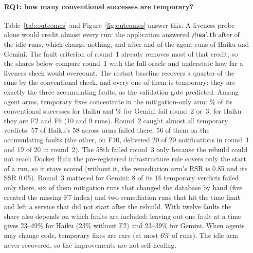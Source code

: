 \paragraph{RQ1: how many conventional successes are temporary?} Table~\ref{tab:outcomes} and Figure~\ref{fig:outcomes}
answer this. A liveness probe alone would credit almost every run: the application answered \texttt{/health} after
\numliveIdleHaiku{} of the idle runs, which change nothing, and after \numliveAIHaiku{} and \numliveAIGemini{} of the agent
runs of Haiku and Gemini. The fault criterion of round~1 already removes most of that credit, so the shares below compare
round~1 with the full oracle and understate how far a liveness check would overcount. The restart baseline recovers a quarter of the runs by the conventional check, and every one of them is
temporary: they are exactly the three accumulating faults, as the validation gate predicted. Among agent arms, temporary
fixes concentrate in the mitigation-only arm: \nummitTempShareHaiku\% of its conventional successes for Haiku and
\nummitTempShareGemini\% for Gemini fail round~2 or~3; for Haiku they are F2 and F6 (10 and 9 runs). Round~2 caught
almost all temporary verdicts: 57 of Haiku's 58 across arms failed there, 56 of them on the accumulating faults (the
other, on F10, delivered 20 of 20 notifications in round~1 and 19 of 20 in round~2). The 58th failed round~3 only
because the rebuild could not reach Docker Hub; the pre-registered infrastructure rule covers only the start of a run,
so it stays scored (without it, the remediation arm's RSR is 0.85 and its SSR 0.05). Round~3 mattered for Gemini: 8 of
its 16 temporary verdicts failed only there, six of them mitigation runs that changed the database by hand (five created
the missing F7 index) and two remediation runs that hit the time limit and left a service that did not start after the
rebuild. With twelve faults the share also depends on which faults are included:
leaving out one fault at a time gives 23--49\% for Haiku (23\% without F2) and 23--39\% for Gemini. When agents may
change code, temporary fixes are rare (at most 6\%
of runs). The idle arm never recovered, so the improvements are not self-healing.

\begin{table}[t]
\centering\scriptsize
\caption{Arm contrasts on RSR within each model: CMH test stratified by fault (primary) and, as a sensitivity analysis added after the runs, a logistic regression with a random intercept per fault (GLMM; Wald interval, likelihood-ratio $p$).}\label{tab:contrasts}
\fittable{}
\end{table}


